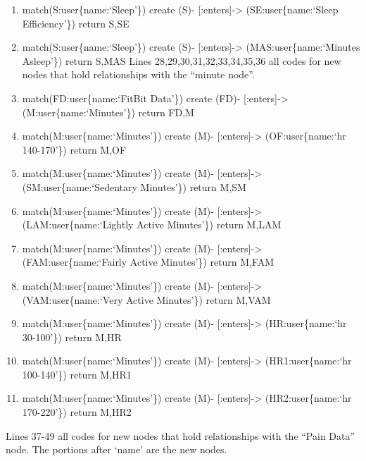\documentclass[]{book}
\providecommand{\tightlist}{%
  \setlength{\itemsep}{0pt}\setlength{\parskip}{0pt}}
\begin{document}
\begin{enumerate}
\def\labelenumi{\arabic{enumi}.}
\setcounter{enumi}{25}
\tightlist
\item
  match(S:user\{name:`Sleep'\}) create (S)- {[}:enters{]}-\textgreater{}
  (SE:user\{name:`Sleep Efficiency'\}) return S,SE
\item
  match(S:user\{name:`Sleep'\}) create (S)- {[}:enters{]}-\textgreater{}
  (MAS:user\{name:`Minutes Asleep'\}) return S,MAS Lines
  28,29,30,31,32,33,34,35,36 all codes for new nodes that hold
  relationships with the ``minute node''.
\item
  match(FD:user\{name:`FitBit Data'\}) create (FD)-
  {[}:enters{]}-\textgreater{} (M:user\{name:`Minutes'\}) return FD,M
\item
  match(M:user\{name:`Minutes'\}) create (M)-
  {[}:enters{]}-\textgreater{} (OF:user\{name:`hr 140-170'\}) return
  M,OF
\item
  match(M:user\{name:`Minutes'\}) create (M)-
  {[}:enters{]}-\textgreater{} (SM:user\{name:`Sedentary Minutes'\})
  return M,SM
\item
  match(M:user\{name:`Minutes'\}) create (M)-
  {[}:enters{]}-\textgreater{} (LAM:user\{name:`Lightly Active
  Minutes'\}) return M,LAM
\item
  match(M:user\{name:`Minutes'\}) create (M)-
  {[}:enters{]}-\textgreater{} (FAM:user\{name:`Fairly Active
  Minutes'\}) return M,FAM
\item
  match(M:user\{name:`Minutes'\}) create (M)-
  {[}:enters{]}-\textgreater{} (VAM:user\{name:`Very Active Minutes'\})
  return M,VAM
\item
  match(M:user\{name:`Minutes'\}) create (M)-
  {[}:enters{]}-\textgreater{} (HR:user\{name:`hr 30-100'\}) return M,HR
\item
  match(M:user\{name:`Minutes'\}) create (M)-
  {[}:enters{]}-\textgreater{} (HR1:user\{name:`hr 100-140'\}) return
  M,HR1
\item
  match(M:user\{name:`Minutes'\}) create (M)-
  {[}:enters{]}-\textgreater{} (HR2:user\{name:`hr 170-220'\}) return
  M,HR2
\end{enumerate}

Lines 37-49 all codes for new nodes that hold relationships with the
``Pain Data'' node. The portions after `name' are the new nodes.
\end{document}
